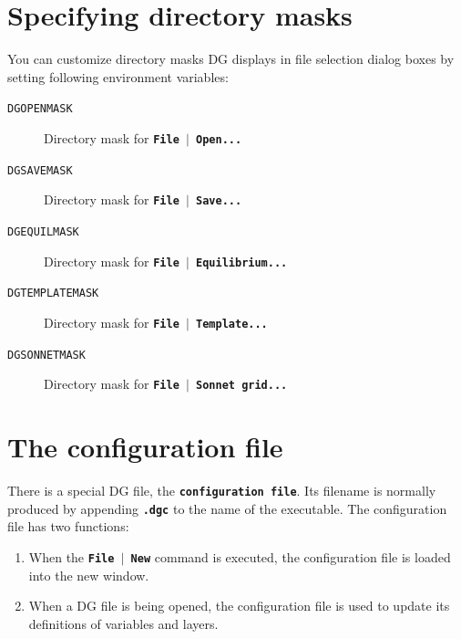 \documentclass[12pt]{report}
\begin{document}
\section{Specifying directory masks}

You can customize directory masks DG displays in file selection dialog
boxes by setting following environment variables:

\begin{description}
\item[\texttt{DGOPENMASK}] Directory mask for
\textbf{\texttt{File \begin{math}\vert{}\end{math} Open...}}
\item[\texttt{DGSAVEMASK}] Directory mask for
\textbf{\texttt{File \begin{math}\vert{}\end{math} Save...}}
\item[\texttt{DGEQUILMASK}] Directory mask for
\textbf{\texttt{File \begin{math}\vert{}\end{math} Equilibrium...}}
\item[\texttt{DGTEMPLATEMASK}] Directory mask for
\textbf{\texttt{File \begin{math}\vert{}\end{math} Template...}}
\item[\texttt{DGSONNETMASK}] Directory mask for
\textbf{\texttt{File \begin{math}\vert{}\end{math} Sonnet grid...}}
\end{description}

\section{The configuration file}

There is a special DG file, the \textbf{\texttt{configuration file}}.
Its filename is normally produced by appending \textbf{\texttt{.dgc}}
to the name of the executable. The configuration file has two
functions:
\begin{enumerate}
  \item When the \textbf{\texttt{File \begin{math}\vert{}\end{math} New}}
command is executed, the configuration file is loaded into the new
window.
  \item When a DG file is being opened, the configuration file is used to
update its definitions of variables and layers.
\end{enumerate}
\end{document}
